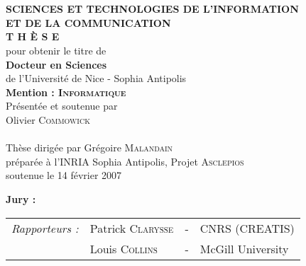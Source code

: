 \begin{titlepage}
\begin{center}
 \\
\vspace*{0.3cm}
 \\
\noindent \textbf{SCIENCES ET TECHNOLOGIES DE L'INFORMATION \\ ET DE LA COMMUNICATION} \\
\vspace*{0.5cm}
\noindent \Huge \textbf{T H È S E} \\
\vspace*{0.3cm}
\noindent \large {pour obtenir le titre de} \\
\vspace*{0.3cm}
\noindent \LARGE \textbf{Docteur en Sciences} \\
\vspace*{0.3cm}
\noindent \Large de l'Université de Nice - Sophia Antipolis \\
\noindent \Large \textbf{Mention : \textsc{Informatique}}\\
\vspace*{0.4cm}
\noindent \large {Présentée et soutenue par\\}
\noindent \LARGE Olivier \textsc{Commowick} \\
\vspace*{0.8cm}
 \\
\vspace*{0.8cm}
\noindent \Large Thèse dirigée par Grégoire \textsc{Malandain} \\
\vspace*{0.2cm}
\noindent \Large préparée à l'INRIA Sophia Antipolis, Projet \textsc{Asclepios} \\
\vspace*{0.2cm}
\noindent \large soutenue le 14 février 2007 \\
\vspace*{0.5cm}
\end{center}
\noindent \large \textbf{Jury :} \\
\begin{center}
\noindent \large
\begin{tabular}{llcl}
      \textit{Rapporteurs :}	& Patrick \textsc{Clarysse}		& - & CNRS (CREATIS)\\
				& Louis \textsc{Collins}		& - & McGill University\\

\end{tabular}
\end{center}
\end{titlepage}
